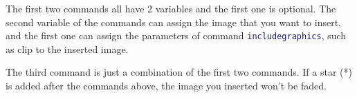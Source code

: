 \documentclass[11pt,svgnames]{article}
\def\cmd#1{\textcolor{MidnightBlue}{\texttt{\string#1}}}
\begin{document}
The first two commands all have 2 variables and the first one is optional. The second variable of the commands can assign the image that you want to insert, and the first one can assign the parameters of command \cmd{includegraphics}, such as clip to the inserted image.

The third command is just a combination of the first two commands. If a star (*) is added after the commands above, the image you inserted won't be faded.
\end{document}
